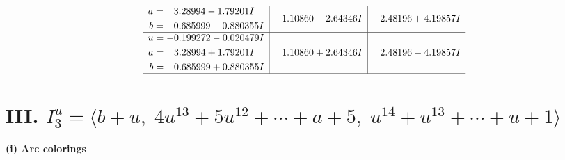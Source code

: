 \documentclass[1p]{elsarticle_modified}
\theoremstyle{definition}
\begin{document}
$$\begin{array}{c|c|c}
\begin{aligned}
a &= \phantom{-}3.28994 - 1.79201 I \\
b &= \phantom{-}0.685999 - 0.880355 I\end{aligned}
 & \phantom{-}1.10860 - 2.64346 I & \phantom{-}2.48196 + 4.19857 I \\ \hline\begin{aligned}
u &= -0.199272 - 0.020479 I \\
a &= \phantom{-}3.28994 + 1.79201 I \\
b &= \phantom{-}0.685999 + 0.880355 I\end{aligned}
 & \phantom{-}1.10860 + 2.64346 I & \phantom{-}2.48196 - 4.19857 I\\
 \hline 
 \end{array}$$\newpage\newpage\renewcommand{\arraystretch}{1}
\centering \section*{III. $I^u_{3}= \langle b+u,\;4 u^{13}+5 u^{12}+\cdots+a+5,\;u^{14}+u^{13}+\cdots+u+1 \rangle$}
\flushleft \textbf{(i) Arc colorings}\\
\end{document}
